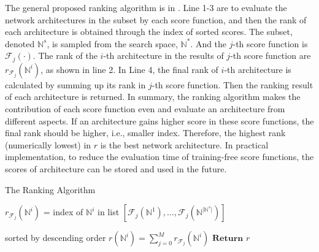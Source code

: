\documentclass[sigconf]{acmart}
\begin{document}
    The general proposed ranking algorithm is in . 
    Line 1-3 are to evaluate the network architectures in the subset 
    by each score function, and then the rank of each architecture is 
    obtained through the index of sorted scores. The subset, denoted 
    $\mathbb N^s$, is sampled from the search space, $\mathbb N^*$. And 
    the $j$-th score function is $\mathcal F_j(\cdot)$. The rank of the 
    $i$-th architecture in the results of $j$-th score function are 
    $r_{\mathcal F_j}(\mathbb N^i)$, as shown in line 2. In Line 4, 
    the final rank of $i$-th architecture is calculated by summing up 
    its rank in $j$-th score function. Then the ranking result of each 
    architecture is returned. In summary, the ranking algorithm makes the 
    contribution of each score function even and evaluate an architecture 
    from different aspects. If an architecture gains higher score in these 
    score functions, the final rank should be higher, i.e., smaller index. 
    Therefore, the highest rank (numerically lowest) in $r$ is the best 
    network architecture. In practical implementation, to reduce the 
    evaluation time of training-free score functions, the scores of 
    architecture can be stored and used in the future. 

    \begin{algorithm}[h]
        \caption{The Ranking Algorithm}\label{alg:rank-based}
        \begin{algorithmic}[1]
                \State $r_{{\mathcal F}_{j}}({\mathbb N}^i)$ = index of ${\mathbb N}^i$ in list $[{\mathcal F}_{j}({\mathbb N}^1),\ldots,{\mathcal F}_{j}({\mathbb N}^{\lvert {\mathbb N}^s\rvert})]$ \par sorted by descending order
            \EndFor
            \State $r({\mathbb N}^i)=\sum^M_{j=0} r_{{\mathcal F}_{j}}({\mathbb N}^i)$
            \State $\textbf{Return }r$
        \end{algorithmic}
    \end{algorithm}
\end{document}
